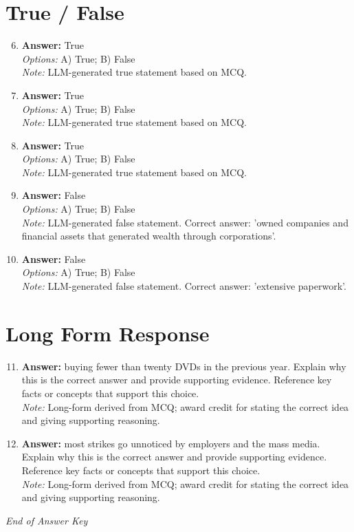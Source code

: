 \documentclass[12pt]{article}
\begin{document}
\section*{True / False}
\begin{enumerate}[label=\arabic*.]
\setcounter{enumi}{5}
\item \textbf{Answer:} True
\\ \textit{Options:} A) True; B) False
\\ \textit{Note:} LLM-generated true statement based on MCQ.
\item \textbf{Answer:} True
\\ \textit{Options:} A) True; B) False
\\ \textit{Note:} LLM-generated true statement based on MCQ.
\item \textbf{Answer:} True
\\ \textit{Options:} A) True; B) False
\\ \textit{Note:} LLM-generated true statement based on MCQ.
\item \textbf{Answer:} False
\\ \textit{Options:} A) True; B) False
\\ \textit{Note:} LLM-generated false statement. Correct answer: 'owned companies and financial assets that generated wealth through corporations'.
\item \textbf{Answer:} False
\\ \textit{Options:} A) True; B) False
\\ \textit{Note:} LLM-generated false statement. Correct answer: 'extensive paperwork'.
\end{enumerate}

\section*{Long Form Response}
\begin{enumerate}[label=\arabic*.]
\setcounter{enumi}{10}
\item \textbf{Answer:} buying fewer than twenty DVDs in the previous year. Explain why this is the correct answer and provide supporting evidence. Reference key facts or concepts that support this choice.
\\ \textit{Note:} Long-form derived from MCQ; award credit for stating the correct idea and giving supporting reasoning.
\item \textbf{Answer:} most strikes go unnoticed by employers and the mass media. Explain why this is the correct answer and provide supporting evidence. Reference key facts or concepts that support this choice.
\\ \textit{Note:} Long-form derived from MCQ; award credit for stating the correct idea and giving supporting reasoning.
\end{enumerate}

\vfill
\noindent\textit{End of Answer Key}
\end{document}
